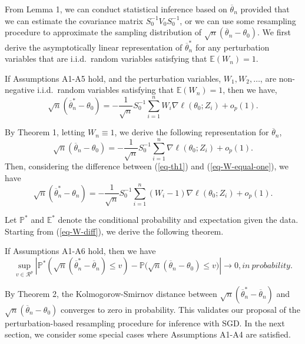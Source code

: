 \documentclass[twoside,11pt]{article}
\def\ol{\overline}
\begin{document}
From Lemma 1, we can conduct statistical inference based on $\ol{\theta}_n$ provided that we can estimate the covariance matrix $S_0^{-1}V_0S_0^{-1}$, or we can use some resampling procedure to approximate the sampling distribution of $\sqrt{n}(\ol{\theta}_n-\theta_0)$. We first derive the asymptotically linear representation of $\ol{\theta}_n^*$ for any perturbation variables that are i.i.d.~random variables satisfying that $\mathbb{E}(W_n)=1$.

\begin{theorem}
	\label{eq-th1}
	If Assumptions A1-A5 hold, and the perturbation variables, $W_1, W_2, \dots$, are non-negative i.i.d.~random variables satisfying that $\mathbb{E}(W_n)=1$, then we have,
	\begin{equation}
	\sqrt{n}(\ol{\theta}_n^*-\theta_0)=-\frac{1}{\sqrt{n}}S_0^{-1}\sum_{i=1}^n W_i \nabla \ell(\theta_0; Z_i)+o_p(1).
	\end{equation}
\end{theorem}


By Theorem 1, letting $W_n\equiv 1$, we derive the following representation for $\ol{\theta}_n$,
\begin{equation}\label{eq-W-equal-one}
\sqrt{n}(\ol{\theta}_n-\theta_0)=-\frac{1}{\sqrt{n}}S_0^{-1}\sum_{i=1}^n \nabla \ell(\theta_0; Z_i)+o_p(1).
\end{equation}
Then, considering the difference between (\ref{eq-th1}) and (\ref{eq-W-equal-one}), we have
\begin{equation}\label{eq-W-diff}
\sqrt{n}(\ol{\theta}_n^*-\theta_n)=-\frac{1}{\sqrt{n}}S_0^{-1}\sum_{i=1}^n (W_i-1) \nabla \ell(\theta_0; Z_i)+o_p(1).
\end{equation}


Let $\mathbb{P}^*$ and $\mathbb{E}^*$ denote the conditional probability and expectation given the data. Starting from (\ref{eq-W-diff}), we derive the following theorem.

\begin{theorem}
	\label{eq-th2}
	If Assumptions A1-A6 hold, then we have
	\begin{equation}
	\sup_{v\in\mathcal{R}^p}\left|\mathbb{P}^*\left(\sqrt{n}(\ol{\theta}^*_n-\ol{\theta}_n)\leq v\right)-\mathbb{P}\Big(\sqrt{n}(\ol{\theta}_n-\theta_0)\leq v\Big)\right| \rightarrow 0, {in\ probability. }
	\end{equation}
\end{theorem}



By Theorem 2, the Kolmogorow-Smirnov distance between $\sqrt{n}(\ol{\theta}^*_n-\ol{\theta}_n)$ and $\sqrt{n}(\ol{\theta}_n-\theta_0)$ converges to zero in probability. This validates our proposal of the perturbation-based resampling procedure for inference with SGD. In the next section, we consider some special cases where Assumptions A1-A4 are satisfied.
\end{document}
